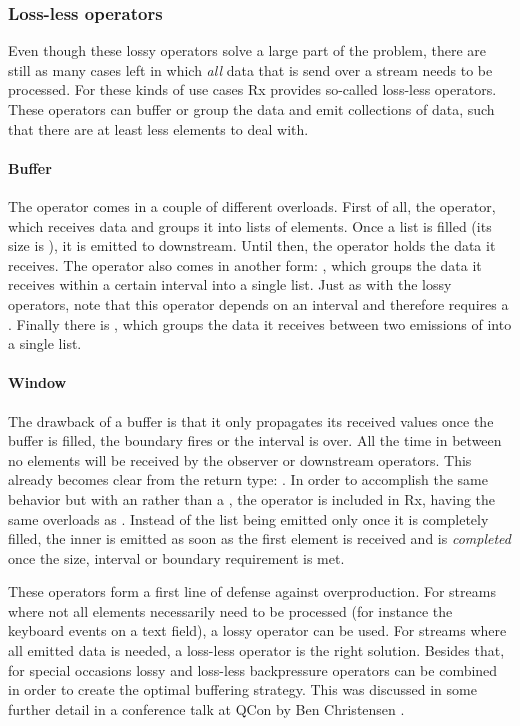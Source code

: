 \subsubsection{Loss-less operators}
Even though these lossy operators solve a large part of the problem, there are still as many cases left in which \emph{all} data that is send over a stream needs to be processed. For these kinds of use cases Rx provides so-called loss-less operators. These operators can buffer or group the data and emit collections of data, such that there are at least less elements to deal with.

\paragraph{Buffer} The  operator comes in a couple of different overloads. First of all, the  operator, which receives data and groups it into lists of  elements. Once a list is filled (its size is ), it is emitted to downstream. Until then, the operator holds the data it receives. The  operator also comes in another form: , which groups the data it receives within a certain interval into a single list. Just as with the lossy operators, note that this operator depends on an interval and therefore requires a \sch. Finally there is , which groups the data it receives between two emissions of  into a single list.

\paragraph{Window} The drawback of a buffer is that it only propagates its received values once the buffer is filled, the boundary \obs fires or the interval is over. All the time in between no elements will be received by the observer or downstream operators. This already becomes clear from the return type: . In order to accomplish the same behavior but with an \obs rather than a , the  operator is included in Rx, having the same overloads as . Instead of the list being emitted only once it is completely filled, the inner \obs is emitted as soon as the first element is received and is \emph{completed} once the size, interval or boundary requirement is met.

These operators form a first line of defense against overproduction. For streams where not all elements necessarily need to be processed (for instance the keyboard events on a text field), a lossy operator can be used. For streams where all emitted data is needed, a loss-less operator is the right solution. Besides that, for special occasions lossy and loss-less backpressure operators can be combined in order to create the optimal buffering strategy. This was discussed in some further detail in a conference talk at QCon by Ben Christensen \cite{christensen2014-RxServiceArchitecture}.

